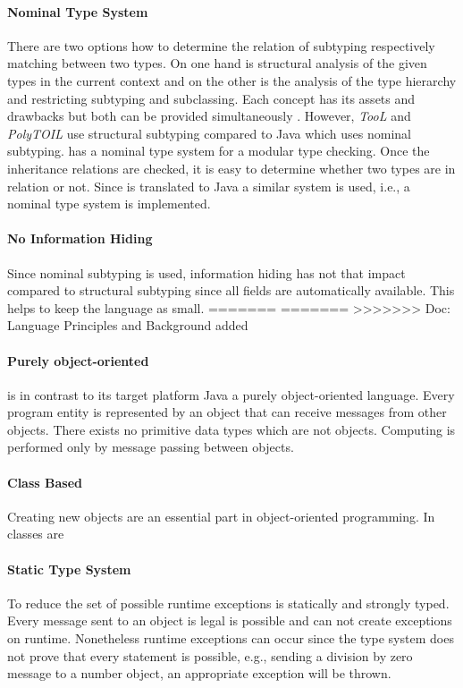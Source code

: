 \paragraph{Nominal Type System}
There are two options how to determine the relation of subtyping
respectively matching between two types. On one hand is structural
analysis of the given types in the current context and on the other
is the analysis of the type hierarchy and restricting subtyping and
subclassing. Each concept has its assets and drawbacks but both can
be provided simultaneously \cite{malayeri_integrating_2008}. However,
\emph{TooL} and \emph{PolyTOIL} use structural subtyping compared to
Java which uses nominal subtyping. \ooplss has a nominal type system
for a modular type checking. Once the inheritance relations are checked,
it is easy to determine whether two types are in relation or not. Since
\ooplss is translated to Java a similar system is used, i.e., a nominal
type system is implemented.

\paragraph{No Information Hiding}
Since nominal subtyping is used, information hiding has not that impact
compared to structural subtyping since all fields are automatically
available. This helps to keep the language as small.
=======
\cite{gawecki_tool:_1995}
=======
>>>>>>> Doc: Language Principles and Background added
\paragraph{Purely object-oriented}
\ooplss is in contrast to its target platform Java a purely
object-oriented language. Every program entity is represented by an
object that can receive messages from other objects. There exists no
primitive data types which are not objects. Computing is performed only
by message passing between objects.

\paragraph{Class Based}
Creating new objects are an essential part in object-oriented
programming. In \ooplss classes are

\paragraph{Static Type System}
To reduce the set of possible runtime exceptions \ooplss is statically
and strongly typed. Every message sent to an object is legal is possible
and can not create exceptions on runtime. Nonetheless runtime exceptions
can occur since the type system does not prove that every statement is
possible, e.g., sending a division by zero message to a number object,
an appropriate exception will be thrown.

